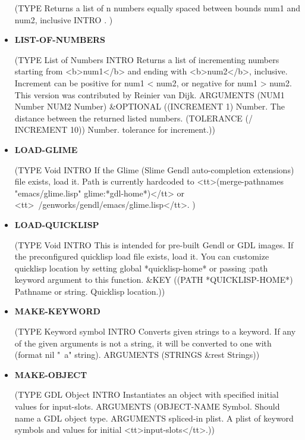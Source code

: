 \documentclass [11pt]{book}
\begin{document}
\begin{itemize}
(TYPE Returns a list of n numbers equally spaced between bounds num1 and num2, inclusive INTRO .
)



\item {}
\label{prim:list-of-numbers}
\textbf{LIST-OF-NUMBERS}

(TYPE List of Numbers INTRO  Returns a list of incrementing numbers starting
from <b>num1</b> and ending with <b>num2</b>, inclusive. Increment can
be positive for num1 < num2, or negative for num1 > num2. This version
was contributed by Reinier van Dijk.
 ARGUMENTS (NUM1 Number NUM2 Number) \&OPTIONAL ((INCREMENT 1) Number. The distance between the returned listed numbers. (TOLERANCE (/ INCREMENT 10)) Number. tolerance for increment.))



\item {}
\label{prim:load-glime}
\textbf{LOAD-GLIME}

(TYPE Void INTRO   If the Glime (Slime Gendl auto-completion extensions) file exists, load it.
Path is currently hardcoded to <tt>(merge-pathnames "emacs/glime.lisp" glime:*gdl-home*)</tt>
or <tt>~/genworks/gendl/emacs/glime.lisp</tt>.
)



\item {}
\label{prim:load-quicklisp}
\textbf{LOAD-QUICKLISP}

(TYPE Void INTRO  This is intended for pre-built Gendl or GDL images. If the
preconfigured quicklisp load file exists, load it. You can customize
quicklisp location by setting global *quicklisp-home* or passing :path
keyword argument to this function.
 \&KEY ((PATH *QUICKLISP-HOME*) Pathname or string. Quicklisp location.))



\item {}
\label{prim:make-keyword}
\textbf{MAKE-KEYWORD}

(TYPE Keyword symbol INTRO  Converts given strings to a keyword.
If any of the given arguments is not a string, it will be converted to one with
(format nil "~a" string).
 ARGUMENTS (STRINGS \&rest Strings))



\item {}
\label{prim:make-object}
\textbf{MAKE-OBJECT}

(TYPE GDL Object INTRO  Instantiates an object with specified initial values for input-slots.
 ARGUMENTS (OBJECT-NAME Symbol. Should name a GDL object type. ARGUMENTS spliced-in plist. A plist of keyword symbols and values for initial <tt>input-slots</tt>.))




\end{itemize}
\end{document}
